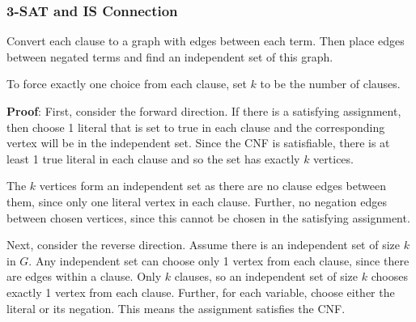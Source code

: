 \documentclass[11pt]{article}
\begin{document}
\subsubsection{3-SAT and IS Connection}
\label{sec:org90c9dfe}
Convert each clause to a graph with edges between each term.
Then place edges between negated terms and find an independent set of this graph.

To force exactly one choice from each clause, set \(k\) to be the number of clauses.

\textbf{Proof}:
First, consider the forward direction. If there is a satisfying assignment, then choose
1 literal that is set to true in each clause and the corresponding vertex will be in the
independent set.
Since the CNF is satisfiable, there is at least 1 true literal in each clause and so the set
has exactly \(k\) vertices.

The \(k\) vertices form an independent set as there are no clause edges between them, since only
one literal vertex in each clause. Further, no negation edges between chosen vertices, since this
cannot be chosen in the satisfying assignment.

Next, consider the reverse direction. Assume there is an independent set of size \(k\) in \(G\).
Any independent set can choose only 1 vertex from each clause, since there are edges within a clause.
Only \(k\) clauses, so an independent set of size \(k\) chooses exactly 1 vertex from each clause.
Further, for each variable, choose either the literal or its negation.
This means the assignment satisfies the CNF.
\end{document}
